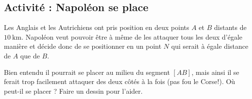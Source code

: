 
\subsection*{Activité : Napoléon se place}

Les Anglais et les Autrichiens ont pris position en deux points \( A\) et \( B\) distants de \( \SI{10}{\kilo\meter}\). Napoléon veut pouvoir être à même de les attaquer tous les deux d'égale manière et décide donc de se positionner en un point $N$ qui serait à égale distance de \( A\) que de \( B\).

Bien entendu il pourrait se placer au milieu du segment \( [AB]\), mais ainsi il se ferait trop facilement attaquer des deux côtés à la fois (pas fou le Corse!). Où peut-il se placer ? Faire un dessin pour l'aider.

